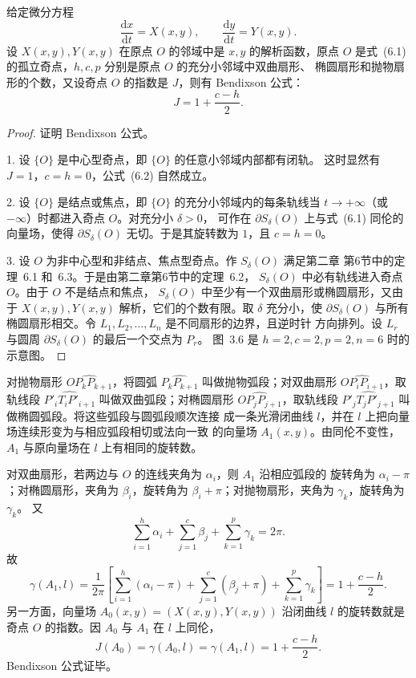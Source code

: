 给定微分方程
\[
\dfrac{\mathrm{d}x}{\mathrm{d}t}=X(x,y),\qquad
\dfrac{\mathrm{d}y}{\mathrm{d}t}=Y(x,y). \tag{6.1}
\]
设 $X(x,y),Y(x,y)$ 在原点 $O$ 的邻域中是 $x,y$ 的解析函数，原点 $O$
是式~(6.1) 的孤立奇点，$h,c,p$ 分别是原点 $O$ 的充分小邻域中双曲扇形、
椭圆扇形和抛物扇形的个数，又设奇点 $O$ 的指数是 $J$，则有
Bendixson 公式：
\[
J=1+\dfrac{c-h}{2}. \tag{6.2}
\]

\begin{proof}
证明 Bendixson 公式。

1. 设 $\{O\}$ 是中心型奇点，即 $\{O\}$ 的任意小邻域内部都有闭轨。
这时显然有 $J=1$，$c=h=0$，公式~(6.2) 自然成立。

2. 设 $\{O\}$ 是结点或焦点，即 $\{O\}$ 的充分小邻域内的每条轨线当
$t\to+\infty$（或 $-\infty$）时都进入奇点 $O$。对充分小 $\delta>0$，
可作在 $\partial S_\delta(O)$ 上与式~(6.1) 同伦的向量场，使得
$\partial S_\delta(O)$ 无切。于是其旋转数为 $1$，且 $c=h=0$。

3. 设 $O$ 为非中心型和非结点、焦点型奇点。作 $S_\delta(O)$ 满足第二章
第6节中的定理~6.1 和~6.3。于是由第二章第6节中的定理~6.2，
$S_\delta(O)$ 中必有轨线进入奇点 $O$。由于 $O$ 不是结点和焦点，
$S_\delta(O)$ 中至少有一个双曲扇形或椭圆扇形，又由于 $X(x,y),Y(x,y)$
解析，它们的个数有限。取 $\delta$ 充分小，使 $\partial S_\delta(O)$
与所有椭圆扇形相交。令 $L_1,L_2,\ldots,L_n$ 是不同扇形的边界，且逆时针
方向排列。设 $L_r$ 与圆周 $\partial S_\delta(O)$ 的最后一个交点为 $P_r$。
图~3.6 是 $h=2,c=2,p=2,n=6$ 时的示意图。
\end{proof}


对抛物扇形 $\widehat{OP_kP_{k+1}}$，将圆弧
$\widehat{P_kP_{k+1}}$ 叫做抛物弧段；对双曲扇形
$\widehat{OP_iP_{i+1}}$，取轨线段 $\widehat{P'_iT_iP'_{i+1}}$
叫做双曲弧段；对椭圆扇形 $\widehat{OP_jP_{j+1}}$，取轨线段
$\widehat{P'_jT_jP'_{j+1}}$ 叫做椭圆弧段。将这些弧段与圆弧段顺次连接
成一条光滑闭曲线 $l$，并在 $l$ 上把向量场连续形变为与相应弧段相切或法向一致
的向量场 $A_1(x,y)$。由同伦不变性，$A_1$ 与原向量场在 $l$ 上有相同的旋转数。

对双曲扇形，若两边与 $O$ 的连线夹角为 $\alpha_i$，则 $A_1$ 沿相应弧段的
旋转角为 $\alpha_i-\pi$；对椭圆扇形，夹角为 $\beta_i$，旋转角为
$\beta_i+\pi$；对抛物扇形，夹角为 $\gamma_k$，旋转角为 $\gamma_k$。
又
\[
\sum_{i=1}^{h}\alpha_i+\sum_{j=1}^{c}\beta_j+
\sum_{k=1}^{p}\gamma_k=2\pi. \tag{6.3}
\]
故
\[
\gamma(A_1,l)
=\dfrac{1}{2\pi}\left[
\sum_{i=1}^{h}(\alpha_i-\pi)+
\sum_{j=1}^{c}(\beta_j+\pi)+
\sum_{k=1}^{p}\gamma_k\right]
=1+\dfrac{c-h}{2}.
\]
另一方面，向量场 $A_0(x,y)=(X(x,y),Y(x,y))$ 沿闭曲线 $l$ 的旋转数就是
奇点 $O$ 的指数。因 $A_0$ 与 $A_1$ 在 $l$ 上同伦，
\[
J(A_0)=\gamma(A_0,l)=\gamma(A_1,l)
=1+\dfrac{c-h}{2}.
\]
Bendixson 公式证毕。

